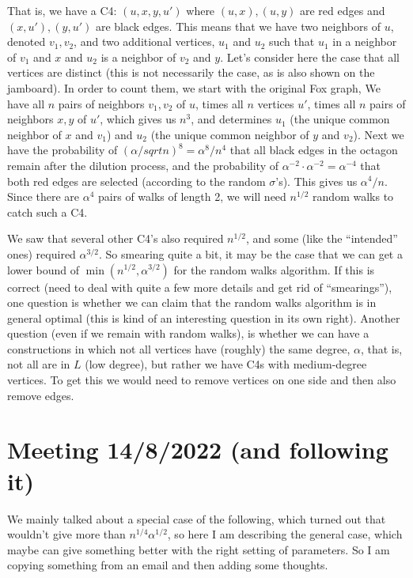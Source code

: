 \documentclass{article}
\begin{document}
That is, we have a C4:  $(u,x,y,u')$ where $(u,x), (u,y)$ are red edges and $(x,u'), (y,u')$ are black edges. This means that we have two neighbors of $u$, denoted $v_1,v_2$, and two additional vertices, $u_1$ and $u_2$ such that $u_1$ in a neighbor of $v_1$ and $x$ and $u_2$ is a neighbor of $v_2$ and $y$. Let's consider here the case that all vertices are distinct (this is not necessarily the case, as is also shown on the jamboard). In order to count them, we start with the original Fox graph, We have all $n$ pairs of neighbors $v_1,v_2$ of $u$, times all $n$ vertices $u'$, times all $n$ pairs of neighbors $x,y$ of $u'$, which gives us $n^3$, and determines $u_1$ (the unique common neighbor of $x$ and $v_1$) and $u_2$ (the unique common neighbor of $y$ and $v_2$). Next we have the probability of $(\alpha/sqrt{n})^8 = \alpha^8/n^4$ that all black edges in the octagon remain after the dilution process, and the probability of $\alpha^{-2}\cdot \alpha^{-2} = \alpha^{-4}$ that both red edges are selected (according to the random $\sigma$'s). This gives us $\alpha^4/n$. Since there are $\alpha^4$ pairs of walks of length 2, we will need $n^{1/2}$ random walks to catch such a C4.

We saw that several other C4's also required $n^{1/2}$, and some (like the ``intended'' ones) required $\alpha^{3/2}$. So smearing quite a bit, it may be the case that we can get a lower bound of $\min(n^{1/2},\alpha^{3/2})$ for the random walks algorithm. If this is correct (need to deal with quite a few more details and get rid of ``smearings''), one question is whether we can claim that the random walks algorithm is in general optimal (this is kind of an interesting question in its own right). Another question (even if we remain with random walks), is whether we can have a constructions in which not all vertices have (roughly) the same degree, $\alpha$, that is, not all are in $L$ (low degree), but rather we have C4s with medium-degree vertices. To get this we would need to remove vertices on one side and then also remove edges.

\newpage

\section{Meeting 14/8/2022 (and following it)}
We mainly talked about a special case of the following, which turned out that wouldn't give more than $n^{1/4}\alpha^{1/2}$, so here I am describing the general case, which maybe can give something better with the right setting of parameters. So I am copying something from an email and then adding some thoughts.
\end{document}
